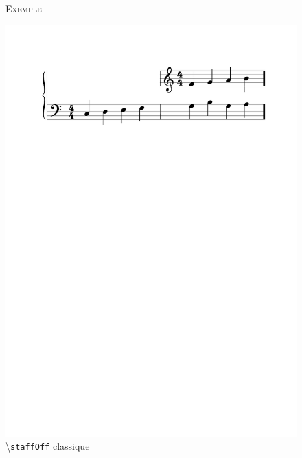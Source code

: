 \documentclass{article}
\newcommand{\code}[1]		{{\small \texttt{#1}}}
\newcommand{\guidotag}[1]	{\textbackslash\code{#1}}
\newcommand{\exemple}		{\vspace{2mm}\hspace*{-6mm}\textsc{Exemple}}
\begin{document}
\begin{figure}[h]
\exemple
\begin{center}
\includegraphics[width=\columnwidth]{img/staffoff.pdf}
\end{center}
\caption{ \guidotag{staffOff} classique}
\label{fig:staffoffsimple}
\end{figure}

\end{document}
